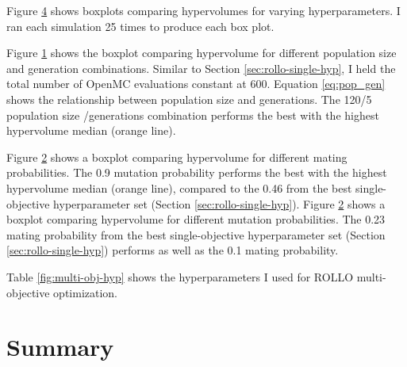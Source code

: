 Figure \ref{fig:hypervolume-comparison} shows boxplots comparing hypervolumes 
for varying hyperparameters. 
I ran each simulation 25 times to produce each box plot. 
\begin{figure}[htbp]
    \centering
    \begin{subfigure}{0.55\textwidth}
    \caption{}
    \label{fig:hypervolume-comparison-gens}
    \end{subfigure}
    \begin{subfigure}{0.55\textwidth}
        \caption{}
        \label{fig:hypervolume-comparison-matpb}
    \end{subfigure}
    \begin{subfigure}{0.55\textwidth}
        \caption{}
        \label{fig:hypervolume-comparison-mutpb}
    \end{subfigure}
    \caption{}
    \label{fig:hypervolume-comparison}
\end{figure}
Figure \ref{fig:hypervolume-comparison-gens} shows the boxplot comparing hypervolume 
for different population size and generation combinations. 
Similar to Section \ref{sec:rollo-single-hyp}, I held the total number of OpenMC 
evaluations constant at 600. 
Equation \ref{eq:pop_gen} shows the relationship between population size and generations. 
The 120/5 population size /generations combination performs the best with the highest 
hypervolume median (orange line). 

Figure \ref{fig:hypervolume-comparison-matpb} shows a boxplot comparing hypervolume 
for different mating probabilities. 
The 0.9 mutation probability performs the best with the highest hypervolume median 
(orange line), compared to the 0.46 from the best single-objective hyperparameter set 
(Section \ref{sec:rollo-single-hyp}). 
Figure \ref{fig:hypervolume-comparison-matpb} shows a boxplot comparing hypervolume 
for different mutation probabilities. 
The 0.23 mating probability from the best single-objective hyperparameter set 
(Section \ref{sec:rollo-single-hyp}) performs as well as the 0.1 mating probability. 

Table \ref{fig:multi-obj-hyp} shows the hyperparameters I used for \gls{ROLLO} 
multi-objective optimization. 

\section{Summary}